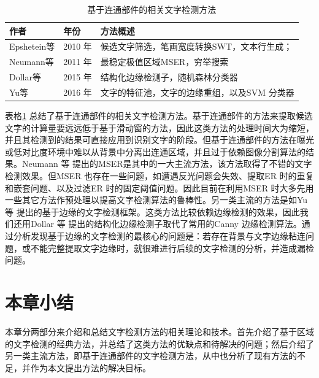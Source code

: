    \begin{table}[!h]
    \centering
    \caption{基于连通部件的相关文字检测方法}
    \begin{tabular}{p{} p{} p{}}
    \toprule
    作者 & 年份 & 方法概述 \\
    \midrule
    Epshetein等\cite{Epshtein2010Detecting} & 2010 年 & 候选文字筛选，笔画宽度转换SWT，文本行生成；\\
    Neumann等\cite{Neumann2011Text} & 2011 年 &   最稳定极值区域MSER，穷举搜索\\
    Dollar等\cite{Dollar2015Fast} & 2015 年 & 结构化边缘检测子，随机森林分类器 \\
    Yu等\cite{Yu2016Scene} & 2016 年 & 文字的特征池，文字的边缘重组，以及SVM 分类器 \\
    \bottomrule
    \end{tabular}
    \label{tab.c2_connected_component_based}
    \end{table}

    表格\ref{tab.c2_connected_component_based} 总结了基于连通部件的相关文字检测方法。基于连通部件的方法来提取候选文字的计算量要远远低于基于滑动窗的方法，因此这类方法的处理时间大为缩短，并且其检测到的结果可直接应用到识别文字的阶段。但基于连通部件的方法在曝光或低对比度环境中难以从背景中分离出连通区域，并且过于依赖图像分割算法的结果。Neumann 等\cite{Neumann2010A,Neumann2011Text,Neumann2012Real} 提出的MSER是其中的一大主流方法，该方法取得了不错的文字检测效果。但MSER 也存在一些问题，如遭遇反光问题会失效、提取ER 时的重复和嵌套问题、以及过滤ER 时的固定阈值问题。因此目前在利用MSER 时大多先用一些其它方法作预处理以提高文字检测算法的鲁棒性。另一类主流的方法是如Yu 等\cite{Yu2016Scene} 提出的基于边缘的文字检测框架。这类方法比较依赖边缘检测的效果，因此我们还用Dollar 等\cite{Dollar2015Fast} 提出的结构化边缘检测子取代了常用的Canny 边缘检测算法。通过分析发现基于边缘的文字检测的最核心的问题是：若存在背景与文字边缘粘连问题，或不能完整提取文字边缘时，就很难进行后续的文字检测的分析，并造成漏检问题。

    \section{本章小结}

    本章分两部分来介绍和总结文字检测方法的相关理论和技术。首先介绍了基于区域的文字检测的经典方法，并总结了这类方法的优缺点和待解决的问题；然后介绍了另一类主流方法，即基于连通部件的文字检测方法，从中也分析了现有方法的不足，并作为本文提出方法的解决目标。

